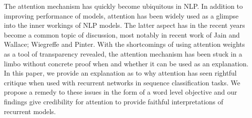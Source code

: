 The attention mechanism has quickly become ubiquitous in NLP. In addition to improving performance of models, attention has been widely used as a glimpse into the inner workings of NLP models. The latter aspect has in the recent years become a common topic of discussion, most notably in recent work of Jain and Wallace; Wiegreffe and Pinter. With the shortcomings of using attention weights as a tool of transparency revealed, the attention mechanism has been stuck in a limbo without concrete proof when and whether it can be used as an explanation. In this paper, we provide an explanation as to why attention has seen rightful critique when used with recurrent networks in sequence classification tasks. We propose a remedy to these issues in the form of a word level objective and our findings give credibility for attention to provide faithful interpretations of recurrent models.
